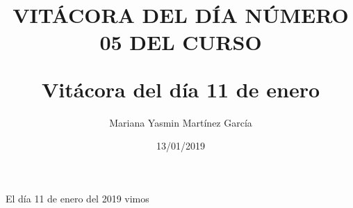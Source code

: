 \documentclass[letterpaper, 12pt, twoside]{article}
\title{\Huge\item\color{red}\textbf {VITÁCORA DEL DÍA NÚMERO 05 DEL CURSO}}
\author{Mariana Yasmin Martínez García}
\date{13/01/2019}
\begin{document}
	\maketitle
	
	\newpage
	\title{\huge\textbf{Vitácora del día 11 de enero\\}}
	El día 11 de enero del 2019 vimos 
\end{document}
